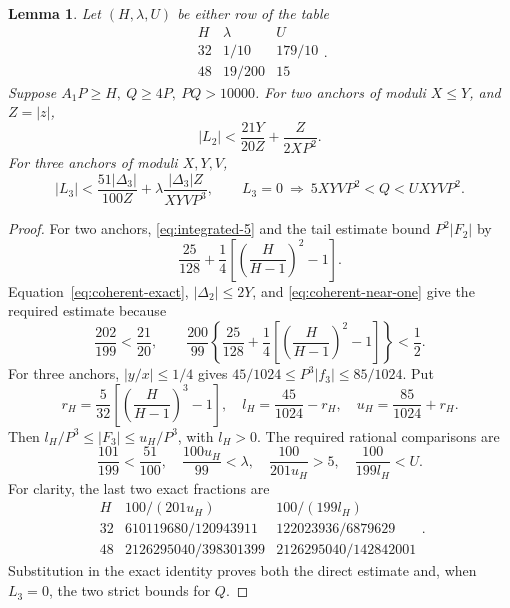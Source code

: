 \documentclass[12pt]{article}
\newtheorem{lemma}[theorem]{Lemma}
\numberwithin{equation}{section}
\begin{document}
\begin{lemma}\label{lem:interpolation-parameters}
Let \((H,\lambda,U)\) be either row of the table
\[
 \begin{array}{c|c|c}
 H&\lambda&U\\\hline
 32&1/10&179/10\\
 48&19/200&15
 \end{array}.
\]
Suppose \(A_1P\ge H,\ Q\ge4P,\ PQ>10000\). For two anchors
of moduli \(X\le Y\), and \(Z=|z|\),
\[
 |L_2|<\frac{21Y}{20Z}+\frac{Z}{2XP^2}.
\]
For three anchors of moduli \(X,Y,V\),
\[
 |L_3|<
 \frac{51|\Delta_3|}{100Z}
 +\lambda\frac{|\Delta_3|Z}{XYV P^3},\qquad
 L_3=0\ \Longrightarrow\
 5XYVP^2<Q<UXYVP^2.
\]
\end{lemma}
\begin{proof}
For two anchors, \eqref{eq:integrated-5} and the tail estimate bound \(P^2|F_2|\) by
\[
 \frac{25}{128}+\frac14\left[\left(\frac{H}{H-1}\right)^2-1\right].
\]
Equation~\eqref{eq:coherent-exact}, \(|\Delta_2|\le2Y\), and
\eqref{eq:coherent-near-one} give the required estimate because
\[
 \frac{202}{199}<\frac{21}{20},\qquad
 \frac{200}{99}\left\{\frac{25}{128}
 +\frac14\left[\left(\frac{H}{H-1}\right)^2-1\right]\right\}<\frac12.
\]
For three anchors, \(|y/x|\le1/4\) gives
\(45/1024\le P^3|f_3|\le85/1024\). Put
\[
 r_H=\frac5{32}\left[\left(\frac{H}{H-1}\right)^3-1\right],
 \quad l_H=\frac{45}{1024}-r_H,\quad
 u_H=\frac{85}{1024}+r_H.
\]
Then \(l_H/P^3\le|F_3|\le u_H/P^3\), with \(l_H>0\).
The required rational comparisons are
\[
 \frac{101}{199}<\frac{51}{100},\quad
 \frac{100u_H}{99}<\lambda,\quad
 \frac{100}{201u_H}>5,\quad
 \frac{100}{199l_H}<U.
\]
For clarity, the last two exact fractions are
\[
 \begin{array}{c|cc}
 H&100/(201u_H)&100/(199l_H)\\\hline
 32&610119680/120943911&122023936/6879629\\
 48&2126295040/398301399&2126295040/142842001
 \end{array}.
\]
Substitution in the exact identity proves both the direct estimate and,
when \(L_3=0\), the two strict bounds for \(Q\).
\end{proof}
\end{document}
